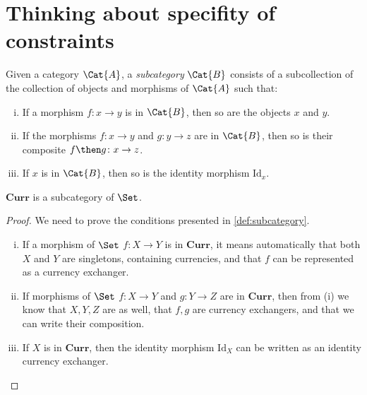 \section{Thinking about specifity of constraints}
\begin{shaded}
\begin{definition}[Subcategory]
\label{def:subcategory}
	Given a category $\Cat{A}$, a \emph{subcategory} $\Cat{B}$ consists of a subcollection of the collection of objects and morphisms of $\Cat{A}$ such that:
	\begin{enumerate}[(i)]
	\item If a morphism $f \colon x\to y$ is in $\Cat{B}$, then so are the objects $x$ and $y$.
	\item If the morphisms $f\colon x\to y$ and $g\colon y\to z$ are in $\Cat{B}$, then so is their composite $f\then g\colon x\to z$.
	\item If $x$ is in $\Cat{B}$, then so is the identity morphism $\text{Id}_x$.
	\end{enumerate}
\end{definition}
\end{shaded}

\begin{lemma}
    $\mathbf{Curr}$ is a subcategory of $\Set$.
\end{lemma}

\begin{proof}
    We need to prove the conditions presented in \cref{def:subcategory}.
    \begin{enumerate}[(i)]
        \item If a morphism of $\Set$ $f\colon X\to Y$ is in $\mathbf{Curr}$, it means automatically that both $X$ and $Y$ are singletons, containing currencies, and that $f$ can be represented as a currency exchanger.
        \item If morphisms of $\Set$ $f\colon X\to Y$ and $g\colon Y \to Z$ are in $\mathbf{Curr}$, then from (i) we know that $X,Y,Z$ are as well, that $f,g$ are currency exchangers, and that we can write their composition.
        \item If $X$ is in $\mathbf{Curr}$, then the identity morphism $\text{Id}_X$ can be written as an identity currency exchanger.
    \end{enumerate}
\end{proof}